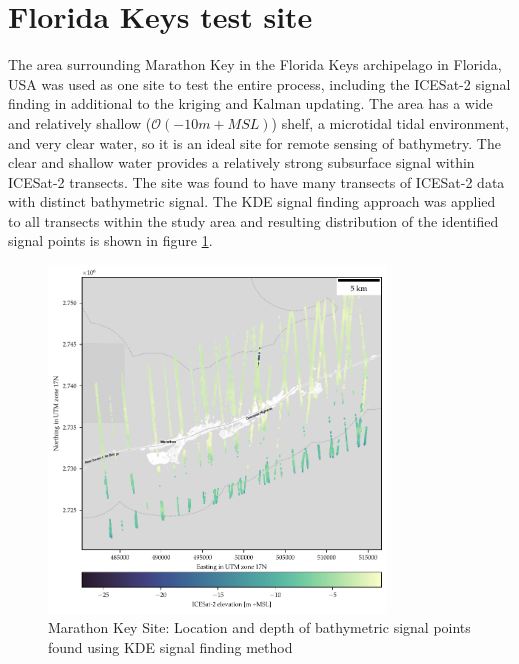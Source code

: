 


\section{Florida Keys test site}


The area surrounding Marathon Key in the Florida Keys archipelago in Florida, USA was used as one site to test the entire process, including the ICESat-2 signal finding in additional to the kriging and Kalman updating. The area has a wide and relatively shallow ($\mathcal{O}(-10 m +MSL)$) shelf, a microtidal tidal environment, and very clear water, so it is an ideal site for remote sensing of bathymetry. The clear and shallow water provides a relatively strong subsurface signal within ICESat-2 transects. The site was found to have many transects of ICESat-2 data with distinct bathymetric signal. The KDE signal finding approach was applied to all transects within the study area and resulting distribution of the identified signal points is shown in figure \ref{fig:keys-photons}.

\begin{figure}[!ht]
    \centering
    \includegraphics[width=0.8\textwidth]{figures/florida_keys_photon_map.pdf}
    \caption{Marathon Key Site: Location and depth of bathymetric signal points found using KDE signal finding method}
    \label{fig:keys-photons}
\end{figure}

